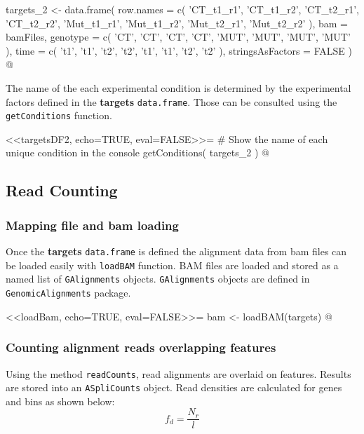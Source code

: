 \documentclass{article}
\begin{document}
targets_2 <- data.frame( row.names = c( 'CT_t1_r1',  'CT_t1_r2',
                                        'CT_t2_r1',  'CT_t2_r2',
                                        'Mut_t1_r1', 'Mut_t1_r2',
                                        'Mut_t2_r1', 'Mut_t2_r2' ),
                         bam = bamFiles,
                         genotype = c( 'CT',  'CT',  'CT',  'CT', 
                                       'MUT', 'MUT', 'MUT', 'MUT' ),
                         time     = c( 't1', 't1', 't2', 't2', 
                                       't1', 't1', 't2', 't2' ),
                         stringsAsFactors = FALSE )
@

The name of the each experimental condition is determined by the experimental
factors defined in the \textbf{targets} \texttt{data.frame}. Those can be
consulted using the \texttt{getConditions} function. 

<<targetsDF2, echo=TRUE, eval=FALSE>>=
# Show the name of each unique condition in the console
getConditions( targets_2 )
@

\subsection{ Read Counting }

\subsubsection{ Mapping file and bam loading } 

Once the \textbf{targets} \texttt{data.frame} is defined the alignment data
from bam files can be loaded easily with \texttt{loadBAM} function. BAM files
are loaded and stored as a named list of \texttt{GAlignments} objects.
\texttt{GAlignments} objects are defined in \texttt{GenomicAlignments} package.

<<loadBam, echo=TRUE, eval=FALSE>>=
bam <- loadBAM(targets)
@

\subsubsection{ Counting alignment reads overlapping features } 

Using the method \texttt{readCounts}, read alignments are overlaid on features.
Results are stored into an \texttt{ASpliCounts} object. Read densities are
calculated for genes and bins as shown below:
\begin{equation*}{
  f_{d} = \frac{ N_{r} }{ l }
}
\end{equation*}
\end{document}
